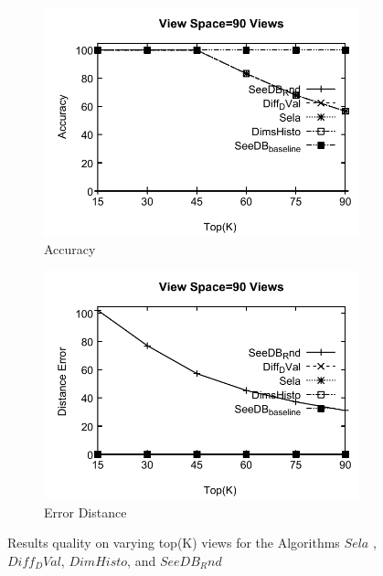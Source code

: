\begin{figure}[h]
 \centering
  \begin{subfigure}[b]{0.42\textwidth}
    \includegraphics[width=\textwidth]{11.pdf}
    \caption{Accuracy  }
       \label{fig:fig3}
  \end{subfigure}
  \begin{subfigure}[b]{0.42\textwidth}
    \includegraphics[width=\textwidth]{12.pdf}
     \caption{Error Distance  }
       \label{fig:fig4}%
  \end{subfigure}
  \caption{Results quality on varying top(K) views for the Algorithms $Sela$ , $Diff_DVal$, $DimHisto$, and $SeeDB_Rnd$}
\end{figure}

